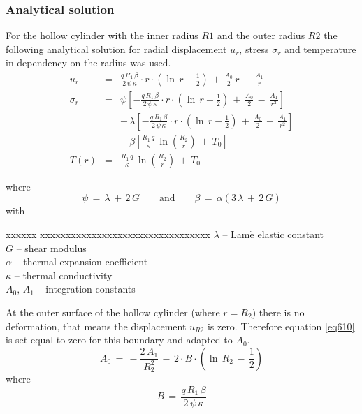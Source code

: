 \subsubsection{Analytical solution} %
For the hollow cylinder with the inner radius $R1$ and the outer radius $R2$ the following analytical solution for radial displacement $u_r$, stress $\sigma_r$ and temperature in dependency on the radius was used.%
\begin{eqnarray}
u_r & = &
\frac{q\,R_1\,\beta}{2\,\psi\,\kappa}\cdot r\cdot
\left(\ln\,r-\frac{1}{2}\right)\,+\,
\frac{A_0}{2}\,r\,+\,
\frac{A_1}{r}
\label{eq610} \\[2.0ex]
\sigma_r & = &
\psi\left[
-\frac{q\,R_1\,\beta}{2\,\psi\,\kappa}\cdot r\cdot
\left(\ln\,r+\frac{1}{2}\right)\,+\,
\frac{A_0}{2}\,-\,
\frac{A_1}{r^2}
\right] \nonumber \\[1.5ex]
 & & +\,
\lambda\left[
-\frac{q\,R_1\,\beta}{2\,\psi\,\kappa}\cdot r\cdot
\left(\ln\,r-\frac{1}{2}\right)\,+\,
\frac{A_0}{2}\,+\,
\frac{A_1}{r^2}
\right] \nonumber \\[1.5ex]
& & -\,\beta\left[
\frac{R_1\,q}{\kappa}\,\ln\left(\frac{R_2}{r}\right)\,+\,T_0
\right]
\label{eq611} \\[2.0ex]
T(r) & = &
\frac{R_1\,q}{\kappa}\,\ln\left(\frac{R_2}{r}\right)\,+\,T_0
\label{eq612}
\end{eqnarray}
{\small
where
\begin{displaymath}
\psi\,=\,\lambda\,+\,2\,G\qquad\mathrm{and}\qquad
\beta\,=\,\alpha\left(3\,\lambda\,+\,2\,G\right)
\end{displaymath}
with
\begin{tabbing}
\=xxxxxx \=xxxxxxxxxxxxxxxxxxxxxxxxxxxxxxxxx  \kill
\> $\lambda$   \> -- Lam$\acute{\mathrm{e}}$ elastic constant \\[0.5ex]
\> $G$         \> -- shear modulus \\[0.5ex]
\> $\alpha$    \> -- thermal expansion coefficient \\[0.5ex]
\> $\kappa$    \> -- thermal conductivity \\[0.5ex]
\> $A_0,\,A_1$ \> -- integration constants
\end{tabbing}
}

At the outer surface of the hollow cylinder (where $r=R_2$) there is no deformation, that means the displacement $u_{R2}$ is zero. Therefore equation \eqref{eq610} is set equal to zero for this boundary and adapted to $A_0$.
\begin{equation}
A_0\,=\,-\frac{2\,A_1}{R^2_2}\,-\,2\cdot B\cdot
\left(\ln\,R_2\,-\,\frac{1}{2}\right)
\label{eq613}
\end{equation}
{\small
where
}
\begin{displaymath}
B\,=\,\frac{q\,R_1\,\beta}{2\,\psi\,\kappa}
\end{displaymath}

